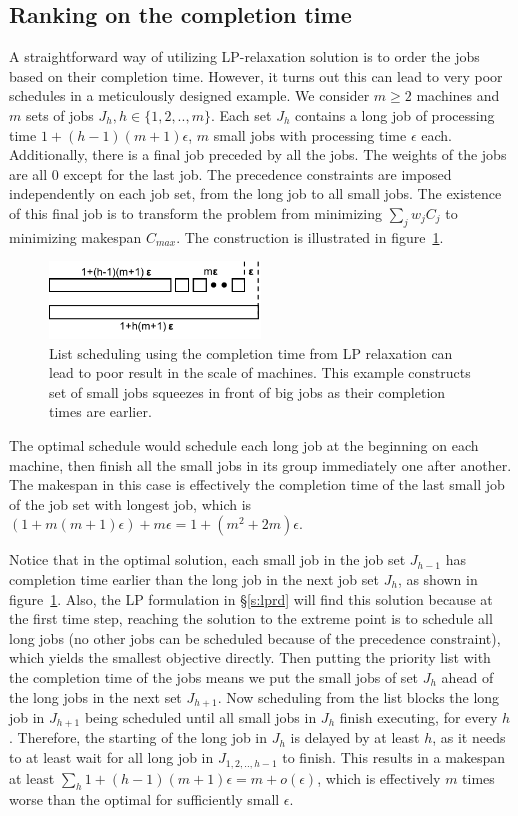 \subsection{Ranking on the completion time} \label{s:lpc}
A straightforward way of utilizing LP-relaxation solution is to order the jobs based on their completion time. However, it turns out this can lead to very poor schedules in a meticulously designed example. We consider $m \geq 2$ machines and $m$ sets of jobs $J_h, h\in\{1,2,..,m\}$. Each set $J_h$ contains a long job of processing time $1 + (h-1)(m+1)\epsilon$, $m$ small jobs with processing time $\epsilon$ each. Additionally, there is a final job preceded by all the jobs. The weights of the jobs are all $0$ except for the last job. The precedence constraints are imposed independently on each job set, from the long job to all small jobs. The existence of this final job is to transform the problem from minimizing $\sum_jw_jC_j$ to minimizing makespan $C_{max}$. The construction is illustrated in figure~\ref{fig:lpc}.

\begin{figure}[h]
\centering
\includegraphics[width=0.5\textwidth]{figs/lpc.pdf}
\caption{List scheduling using the completion time from LP relaxation can lead to poor result in the scale of machines. This example constructs set of small jobs squeezes in front of big jobs as their completion times are earlier.}
\label{fig:lpc}
\end{figure}

The optimal schedule would schedule each long job at the beginning on each machine, then finish all the small jobs in its group immediately one after another. The makespan in this case is effectively the completion time of the last small job of the job set with longest job, which is $(1 + m(m+1)\epsilon) + m\epsilon = 1 +(m^2+2m)\epsilon$. 

Notice that in the optimal solution, each small job in the job set $J_{h-1}$ has completion time earlier than the long job in the next job set $J_h$, as shown in figure~\ref{fig:lpc}. Also, the LP formulation in \S\ref{s:lprd} will find this solution because at the first time step, reaching the solution to the extreme point is to schedule all long jobs (no other jobs can be scheduled because of the precedence constraint), which yields the smallest objective directly. Then putting the priority list with the completion time of the jobs means we put the small jobs of set $J_h$ ahead of the long jobs in the next set $J_{h+1}$. Now scheduling from the list blocks the long job in $J_{h+1}$ being scheduled until all small jobs in $J_h$ finish executing, for every $h$. Therefore, the starting of the long job in $J_h$ is delayed by at least $h$, as it needs to at least wait for all long job in $J_{1, 2,.., h-1}$ to finish. This results in a makespan at least $\sum_h 1 + (h-1)(m+1)\epsilon = m + o(\epsilon)$, which is effectively $m$ times worse than the optimal for sufficiently small $\epsilon$.

